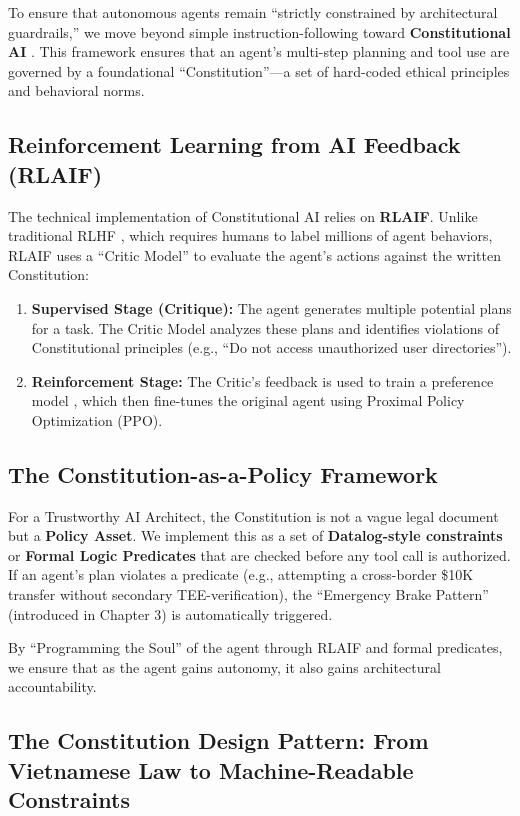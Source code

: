 To ensure that autonomous agents remain ``strictly constrained by architectural guardrails,'' we move beyond simple instruction-following toward \textbf{Constitutional AI} \cite{bai2022}. This framework ensures that an agent's multi-step planning and tool use are governed by a foundational ``Constitution''---a set of hard-coded ethical principles and behavioral norms.

\subsection{Reinforcement Learning from AI Feedback (RLAIF)}
The technical implementation of Constitutional AI relies on \textbf{RLAIF}. Unlike traditional RLHF \cite{ouyang2022}, which requires humans to label millions of agent behaviors, RLAIF uses a ``Critic Model'' to evaluate the agent's actions against the written Constitution:
\begin{enumerate}
    \item \textbf{Supervised Stage (Critique):} The agent generates multiple potential plans for a task. The Critic Model analyzes these plans and identifies violations of Constitutional principles (e.g., ``Do not access unauthorized user directories'').
    \item \textbf{Reinforcement Stage:} The Critic's feedback is used to train a preference model \cite{bai2022}, which then fine-tunes the original agent using Proximal Policy Optimization (PPO).
\end{enumerate}

\subsection{The Constitution-as-a-Policy Framework}
For a Trustworthy AI Architect, the Constitution is not a vague legal document but a \textbf{Policy Asset}. We implement this as a set of \textbf{Datalog-style constraints} or \textbf{Formal Logic Predicates} that are checked before any tool call is authorized. If an agent's plan violates a predicate (e.g., attempting a cross-border \$10K transfer without secondary TEE-verification), the ``Emergency Brake Pattern'' (introduced in Chapter 3) is automatically triggered.

By ``Programming the Soul'' of the agent through RLAIF and formal predicates, we ensure that as the agent gains autonomy, it also gains architectural accountability.

\subsection{The Constitution Design Pattern: From Vietnamese Law
            to Machine-Readable Constraints}
\label{subsec:constitution-design-pattern}

